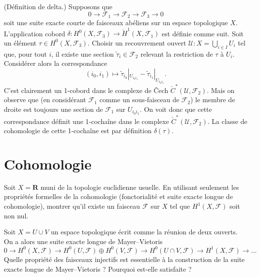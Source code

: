 \begin{definition}
\label{definition-delta}
(Définition de delta.) Supposons que
$$
0 \to {\mathcal F}_1 \to {\mathcal F}_2 \to {\mathcal F}_3 \to 0
$$
soit une suite exacte courte de faisceaux abéliens sur un espace topologique $X$.
L'application cobord
$\delta : H^0(X, {\mathcal F}_3) \to {\check H}^1(X, {\mathcal F}_1)$
est définie comme suit. Soit un élément $\tau \in H^0(X, {\mathcal F}_3)$.
Choisir un recouvrement ouvert ${\mathcal U} : X = \bigcup_{i\in I} U_i$ tel
que, pour tout $i$, il existe une section $\tilde \tau_i \in {\mathcal F}_2$
relevant la restriction de $\tau$ à $U_i$. Considérer alors la correspondance
$$
(i_0, i_1) \longmapsto
\tilde \tau_{i_0}|_{U_{i_0i_1}} - \tilde \tau_{i_1}|_{U_{i_0i_1}}.
$$
C'est clairement un 1-cobord dans le complexe de {\v C}ech
${\check C}^\ast({\mathcal U}, {\mathcal F}_2)$. Mais on observe que
(en considérant ${\mathcal F}_1$ comme un sous-faisceau de ${\mathcal F}_2$) le membre de droite
est toujours une section de ${\mathcal F}_1$ sur $U_{i_0i_1}$. On voit donc
que cette correspondance définit une 1-cochaîne dans le complexe
${\check C}^\ast({\mathcal U}, {\mathcal F}_2)$. La classe de cohomologie
de cette 1-cochaîne est par définition {\it $\delta(\tau)$}.
\end{definition}



\section{Cohomologie}
\label{section-cohomology}

\begin{exercise}
\label{exercise-cohomology-not-zero}
Soit $X = \mathbf{R}$ muni de la topologie euclidienne usuelle.
En utilisant seulement les propriétés formelles de la cohomologie (fonctorialité
et suite exacte longue de cohomologie), montrer qu'il
existe un faisceau $\mathcal{F}$ sur $X$ tel que $H^1(X, \mathcal{F})$ soit non nul.
\end{exercise}

\begin{exercise}
\label{exercise-mayer-vietoris}
Soit $X = U \cup V$ un espace topologique écrit comme la
réunion de deux ouverts. On a alors une suite exacte longue
de Mayer--Vietoris
$$
0 \to
H^0(X, \mathcal{F}) \to
H^0(U, \mathcal{F}) \oplus H^0(V, \mathcal{F}) \to
H^0(U \cap V, \mathcal{F}) \to
H^1(X, \mathcal{F}) \to \ldots
$$
Quelle propriété des faisceaux injectifs est essentielle à la construction
de la suite exacte longue de Mayer--Vietoris ? Pourquoi est-elle satisfaite ?
\end{exercise}

